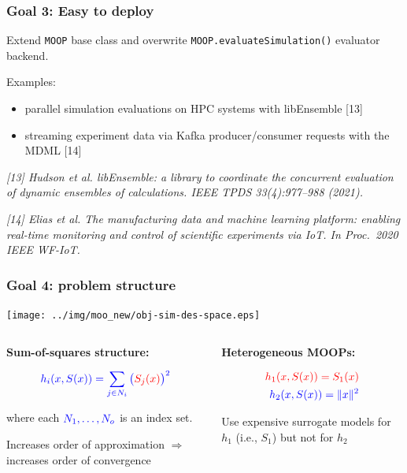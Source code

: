 \documentclass[aspectratio=169]{beamer}
\begin{document}
\begin{frame}\frametitle{Goal 3: Easy to deploy}

Extend {\tt MOOP} base class and overwrite {\tt MOOP.evaluateSimulation()}
evaluator backend.

\bigskip

Examples:
\begin{itemize}
\item parallel simulation evaluations on HPC systems with libEnsemble [13]
\item streaming experiment data via Kafka producer/consumer requests with the MDML [14]
\end{itemize}

\vfill

{\tiny\it
[13] Hudson et al.
libEnsemble: a library to coordinate the concurrent evaluation of dynamic ensembles of calculations.
IEEE TPDS 33(4):977--988 (2021).\\
}

\medskip

{\tiny\it
[14] Elias et al.
The manufacturing data and machine learning platform: enabling real-time monitoring and control of scientific experiments via IoT.
In Proc.\ 2020 IEEE WF-IoT.\\
}

\end{frame}

\begin{frame}\frametitle{Goal 4: problem structure}
\begin{center}
\texttt{[image: ../img/moo\_new/obj-sim-des-space.eps]}
\end{center}
\begin{columns}
\begin{column}{0.5\textwidth}
\textbf{Sum-of-squares structure:}

\medskip

{\large
$$
{\color{blue} h_i(x, S(x)) = \sum_{j \in N_i} \big({\color{red}S_j(x)}\big)^2}
$$

where each ${\color{blue} N_1, \ldots, N_o}$ is an index set.
}

\bigskip

Increases order of approximation $\Rightarrow$
increases order of convergence

\end{column}
\begin{column}{0.5\textwidth}
\textbf{Heterogeneous MOOPs:}

{\large
\begin{align*}
{\color{red} h_1(x, S(x)) = S_1(x)}\\
{\color{blue} h_2(x, S(x)) = \|x \|^2}
\end{align*}
}

Use expensive surrogate models for {\color{red} $h_1$} (i.e.,
{\color{red} $S_1$}) but not for {\color{blue} $h_2$}

\end{column}
\end{columns}
\end{frame}
\end{document}
